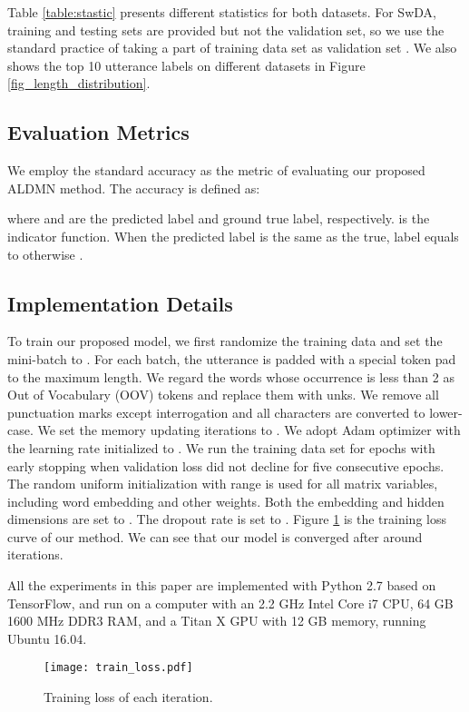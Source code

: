 \documentclass[conference]{IEEEtran}
\begin{document}
	
	Table \ref{table:stastic} presents different statistics for both datasets. For SwDA, training and testing sets are provided but not the validation set, so we use the standard practice of taking a part of training data set as validation set \cite{lee2016sequential}. We also shows the top 10 utterance labels on different datasets in Figure \ref{fig_length_distribution}.
	
	\subsection{Evaluation Metrics}
	We employ the standard accuracy as the metric of evaluating our proposed ALDMN method. The accuracy is defined as: 
	
	
	where  and  are the predicted label and ground true label, respectively.  is the indicator function. When the predicted label is the same as the true, label  equals to  otherwise .
	
	\subsection{Implementation Details}
	To train our proposed model, we first randomize the training data and set the mini-batch to . For each batch, the utterance is padded with a special token pad to the maximum length. We regard the words whose occurrence is less than 2 as Out of Vocabulary (OOV) tokens and replace them with unks. We remove all punctuation marks except interrogation and all characters are converted to lower-case. We set the memory updating iterations to . We adopt Adam \cite{kingma2014adam} optimizer with the learning rate initialized to . We run the training data set for  epochs with early stopping when validation loss did not decline for five consecutive epochs. The random uniform initialization with range  is used for all matrix variables, including word embedding and other weights. Both the embedding and hidden dimensions are set to . The dropout rate is set to . Figure \ref{fig:training_loss} is the training loss curve of our method. We can see that our model is converged after around  iterations.


	All the experiments in this paper are implemented with Python 2.7 based on TensorFlow, and run on a computer with an 2.2 GHz Intel Core i7 CPU, 64 GB 1600 MHz DDR3 RAM, and a Titan X GPU with 12 GB memory, running Ubuntu 16.04.
	
	\begin{figure}[!t]
		\centering
		\texttt{[image: train\_loss.pdf]}
		\caption{Training loss of each iteration.}
		\label{fig:training_loss}
	\end{figure}
\end{document}

